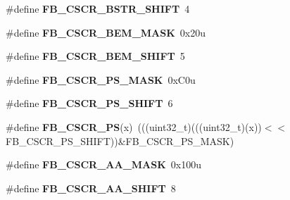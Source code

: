 \begin{DoxyCompactItemize}
\item 
\#define {\bfseries F\+B\+\_\+\+C\+S\+C\+R\+\_\+\+B\+S\+T\+R\+\_\+\+S\+H\+I\+FT}~4\hypertarget{group__FB__Register__Masks_ga161827d21e9f36d9dc4a42a3fc287dd7}{}\label{group__FB__Register__Masks_ga161827d21e9f36d9dc4a42a3fc287dd7}

\item 
\#define {\bfseries F\+B\+\_\+\+C\+S\+C\+R\+\_\+\+B\+E\+M\+\_\+\+M\+A\+SK}~0x20u\hypertarget{group__FB__Register__Masks_gaef7f70f7c6d39c8e1de2a16ccb4b3ccb}{}\label{group__FB__Register__Masks_gaef7f70f7c6d39c8e1de2a16ccb4b3ccb}

\item 
\#define {\bfseries F\+B\+\_\+\+C\+S\+C\+R\+\_\+\+B\+E\+M\+\_\+\+S\+H\+I\+FT}~5\hypertarget{group__FB__Register__Masks_ga2dd3f47a9401af7ae8838b7dc7c379f8}{}\label{group__FB__Register__Masks_ga2dd3f47a9401af7ae8838b7dc7c379f8}

\item 
\#define {\bfseries F\+B\+\_\+\+C\+S\+C\+R\+\_\+\+P\+S\+\_\+\+M\+A\+SK}~0x\+C0u\hypertarget{group__FB__Register__Masks_ga07623c4ea4b4dfdc64c7dc0431719350}{}\label{group__FB__Register__Masks_ga07623c4ea4b4dfdc64c7dc0431719350}

\item 
\#define {\bfseries F\+B\+\_\+\+C\+S\+C\+R\+\_\+\+P\+S\+\_\+\+S\+H\+I\+FT}~6\hypertarget{group__FB__Register__Masks_ga2cd33266c104fc645dcadaea7e659aa8}{}\label{group__FB__Register__Masks_ga2cd33266c104fc645dcadaea7e659aa8}

\item 
\#define {\bfseries F\+B\+\_\+\+C\+S\+C\+R\+\_\+\+PS}(x)~(((uint32\+\_\+t)(((uint32\+\_\+t)(x))$<$$<$F\+B\+\_\+\+C\+S\+C\+R\+\_\+\+P\+S\+\_\+\+S\+H\+I\+FT))\&F\+B\+\_\+\+C\+S\+C\+R\+\_\+\+P\+S\+\_\+\+M\+A\+SK)\hypertarget{group__FB__Register__Masks_ga2268294cb3a73b4f9643e72aba119dec}{}\label{group__FB__Register__Masks_ga2268294cb3a73b4f9643e72aba119dec}

\item 
\#define {\bfseries F\+B\+\_\+\+C\+S\+C\+R\+\_\+\+A\+A\+\_\+\+M\+A\+SK}~0x100u\hypertarget{group__FB__Register__Masks_gae26d2b6451432c0000d30a23e541020f}{}\label{group__FB__Register__Masks_gae26d2b6451432c0000d30a23e541020f}

\item 
\#define {\bfseries F\+B\+\_\+\+C\+S\+C\+R\+\_\+\+A\+A\+\_\+\+S\+H\+I\+FT}~8\hypertarget{group__FB__Register__Masks_gaf3d9d750b7dddf0d1df65c98d7ecc7e1}{}\label{group__FB__Register__Masks_gaf3d9d750b7dddf0d1df65c98d7ecc7e1}


\end{DoxyCompactItemize}
